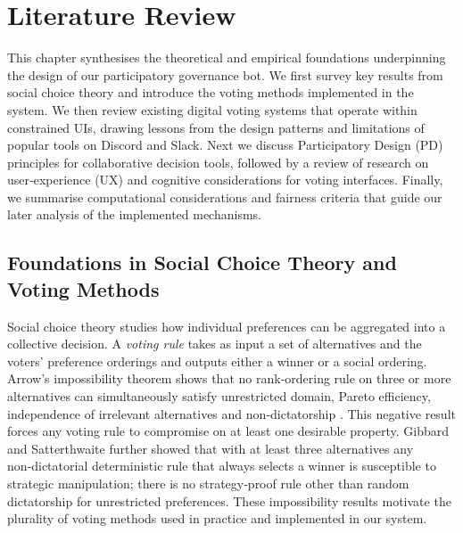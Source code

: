\doublespacing %

\chapter{Literature Review}
\label{ch:litreview}

\begin{spacing}{1} %
\minitoc %
\end{spacing} %
\thesisspacing %

This chapter synthesises the theoretical and empirical foundations
underpinning the design of our participatory governance bot.  We first
survey key results from social choice theory and introduce the voting
methods implemented in the system.  We then review existing digital
voting systems that operate within constrained UIs, drawing
lessons from the design patterns and limitations of popular tools on
Discord and Slack.  Next we discuss Participatory Design (PD) principles for
collaborative decision tools, followed by a review of research on
user‑experience (UX) and cognitive considerations for voting
interfaces.  Finally, we summarise computational considerations and
fairness criteria that guide our later analysis of the implemented
mechanisms.

\section{Foundations in Social Choice Theory and Voting Methods}

Social choice theory studies how individual preferences can be aggregated
into a collective decision.  A \emph{voting rule} takes as input a set of
alternatives and the voters’ preference orderings and outputs either a
winner or a social ordering.  Arrow’s impossibility theorem shows that
no rank‑ordering rule on three or more alternatives can simultaneously
satisfy unrestricted domain, Pareto efficiency, independence of
irrelevant alternatives and non‑dictatorship \cite{Arrow1951,Gibbard1973,Satterthwaite1975}.
This negative result forces any voting rule to compromise on at least
one desirable property.  Gibbard and Satterthwaite further showed that
with at least three alternatives any non‑dictatorial deterministic rule
that always selects a winner is susceptible to strategic
manipulation; there is no strategy‑proof rule other than random
dictatorship for unrestricted preferences.  These impossibility results
motivate the plurality of voting methods used in practice and
implemented in our system.


